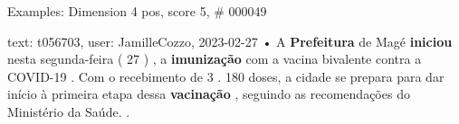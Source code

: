 \begin{frame}{Examples: Dimension 4 pos, score 5, \# 000049}
\footnotesize
\begin{exampleblock}{text: t056703, user: JamilleCozzo, 2023-02-27}
• A \textbf{Prefeitura} de Magé \textbf{iniciou} nesta segunda-feira ( 27 ) , a 
\textbf{imunização} com a vacina bivalente contra a COVID-19 . Com o 
recebimento de 3 . 180 doses, a cidade se prepara para dar início à primeira 
etapa dessa \textbf{vacinação} , seguindo as recomendações do Ministério da 
Saúde. . 
\end{exampleblock}
\end{frame}
